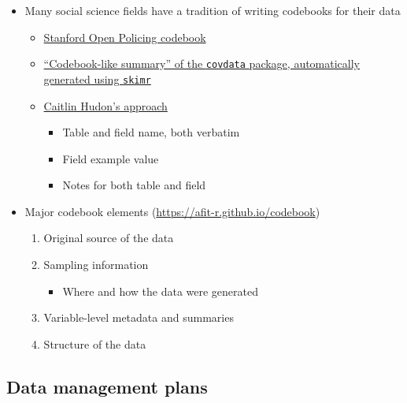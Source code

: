\documentclass[
]{article}
\providecommand{\tightlist}{%
  \setlength{\itemsep}{0pt}\setlength{\parskip}{0pt}}
\begin{document}
\begin{itemize}
\tightlist
\item
  Many social science fields have a tradition of writing codebooks for their data

  \begin{itemize}
  \tightlist
  \item
    \href{https://github.com/stanford-policylab/opp/blob/master/data_readme.md}{Stanford Open Policing codebook}
  \item
    \href{https://kjhealy.github.io/covdata/articles/codebook.html}{``Codebook-like summary'' of the \texttt{covdata} package, automatically generated using \texttt{skimr}}
  \item
    \href{https://caitlinhudon.com/2018/10/30/data-dictionaries/}{Caitlin Hudon's approach}

    \begin{itemize}
    \tightlist
    \item
      Table and field name, both verbatim
    \item
      Field example value
    \item
      Notes for both table and field
    \end{itemize}
  \end{itemize}
\item
  Major codebook elements (\url{https://afit-r.github.io/codebook})

  \begin{enumerate}
  \def\labelenumi{\arabic{enumi}.}
  \tightlist
  \item
    Original source of the data
  \item
    Sampling information

    \begin{itemize}
    \tightlist
    \item
      Where and how the data were generated
    \end{itemize}
  \item
    Variable-level metadata and summaries
  \item
    Structure of the data
  \end{enumerate}
\end{itemize}

\hypertarget{data-management-plans}{%
\subsection{Data management plans}\label{data-management-plans}}
\end{document}
